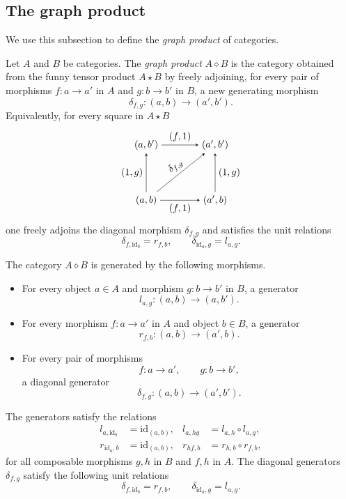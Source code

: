 \documentclass{tac}
\begin{document}
\subsection*{The graph product}
We use this subsection to define the \emph{graph product} of categories.
\begin{definition}
Let $A$ and $B$ be categories. The \emph{graph product}
$A\diamond B$ is the category obtained from the funny tensor
product $A\star B$ by freely adjoining, for every pair of morphisms
$f:a\to a'$ in $A$ and $g:b\to b'$ in $B$, a new generating morphism
\[
\delta_{f,g}:(a,b)\longrightarrow(a',b').
\]
Equivalently, for every square in $A\star B$
\[
\begin{tikzpicture}[baseline=(current bounding box.center),>=stealth,scale=1]
\node (00) at (0,0) {$(a,b)$};
\node (10) at (2.5,0) {$(a',b)$};
\node (01) at (0,2) {$(a,b')$};
\node (11) at (2.5,2) {$(a',b')$};

\draw[->] (00) -- node[below] {$(f,1)$} (10);
\draw[->] (10) -- node[right] {$(1,g)$} (11);
\draw[->] (00) -- node[left] {$(1,g)$} (01);
\draw[->] (01) -- node[above] {$(f,1)$} (11);

\draw[->] (00) -- node[sloped,above] {$\delta_{f,g}$} (11);
\end{tikzpicture}
\]
one freely adjoins the diagonal morphism $\delta_{f,g}$ and satisfies the unit relations
\[
\delta_{f,\mathrm{id}_b}=r_{f,b},
\qquad
\delta_{\mathrm{id}_a,g}=l_{a,g}.
\]
\end{definition}

The category $A\diamond B$ is generated by the following morphisms.

\begin{itemize}
    \item For every object $a\in A$ and morphism $g:b\to b'$ in $B$, a generator
    \[
    l_{a,g}:(a,b)\to(a,b').
    \]

    \item For every morphism $f:a\to a'$ in $A$ and object $b\in B$, a generator
    \[
    r_{f,b}:(a,b)\to(a',b).
    \]

    \item For every pair of morphisms
    \[
    f:a\to a',
    \qquad
    g:b\to b',
    \]
    a diagonal generator
    \[
    \delta_{f,g}:(a,b)\to(a',b').
    \]
\end{itemize}

The generators satisfy the relations
\begin{align*}
l_{a,\mathrm{id}_b}&=\mathrm{id}_{(a,b)},&
l_{a,hg}&=l_{a,h}\circ l_{a,g},\\
r_{\mathrm{id}_a,b}&=\mathrm{id}_{(a,b)},&
r_{hf,b}&=r_{h,b}\circ r_{f,b},
\end{align*}
for all composable morphisms \(g,h\) in \(B\) and \(f,h\) in \(A\). The diagonal generators \(\delta_{f,g}\)
satisfy the following unit relations
\[
\delta_{f,\mathrm{id}_b}=r_{f,b},
\qquad
\delta_{\mathrm{id}_a,g}=l_{a,g}.
\]
\end{document}
